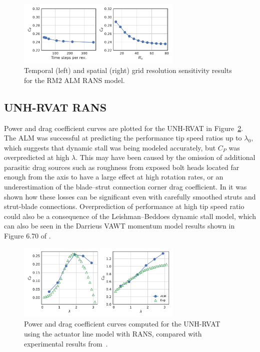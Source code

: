 \documentclass[times]{weauth}
\begin{document}
\begin{figure}
    \centering

    \includegraphics[width=0.7\textwidth]{RM2-ALM_verification}

    \caption{Temporal (left) and spatial (right) grid resolution sensitivity
        results for the RM2 ALM RANS model.}

    \label{fig:RM2-ALM-verification}
\end{figure}


\subsection{UNH-RVAT RANS}

Power and drag coefficient curves are plotted for the UNH-RVAT in
Figure~\ref{fig:RVAT-ALM-perf-curves}. The ALM was successful at predicting the
performance tip speed ratios up to $\lambda_0$, which suggests that dynamic
stall was being modeled accurately, but $C_P$ was overpredicted at high
$\lambda$. This may have been caused by the omission of additional parasitic
drag sources such as roughness from exposed bolt heads located far enough from
the axis to have a large effect at high rotation rates, or an underestimation of
the blade--strut connection corner drag coefficient. In
\cite{Rawlings2008,Bachant2016-RM2-paper} it was shown how these losses can be
significant even with carefully smoothed struts and strut-blade connections.
Overprediction of performance at high tip speed ratio could also be a
consequence of the Leishman--Beddoes dynamic stall model, which can also be seen
in the Darrieus VAWT momentum model results shown in Figure 6.70 of
\cite{Para2002}.

\begin{figure}
    \centering

    \includegraphics[width=0.7\textwidth]{RVAT-ALM_perf-curves}

    \caption{Power and drag coefficient curves computed for the UNH-RVAT using
        the actuator line model with RANS, compared with experimental results
        from~\cite{Bachant2016-RVAT-Re-dep}.}

    \label{fig:RVAT-ALM-perf-curves}
\end{figure}
\end{document}
